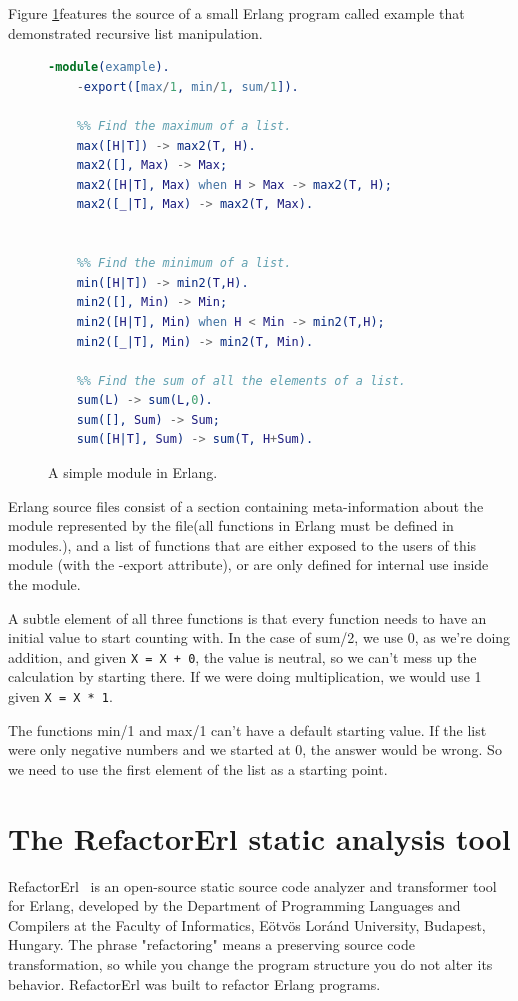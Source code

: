 Figure \ref{fig:example_erlang}features the source of a small Erlang program
called example that demonstrated recursive list manipulation.
\begin{figure}[h]
	\begin{lstlisting}[extendedchars=true, language=Erlang, basicstyle=\footnotesize\ttfamily, keywordstyle=\color{red}]
	-module(example). 
	-export([max/1, min/1, sum/1]).
	
	%% Find the maximum of a list.
	max([H|T]) -> max2(T, H).
	max2([], Max) -> Max;
	max2([H|T], Max) when H > Max -> max2(T, H);
	max2([_|T], Max) -> max2(T, Max).
	

	%% Find the minimum of a list.
	min([H|T]) -> min2(T,H).
	min2([], Min) -> Min;
	min2([H|T], Min) when H < Min -> min2(T,H);
	min2([_|T], Min) -> min2(T, Min).
	
	%% Find the sum of all the elements of a list.
	sum(L) -> sum(L,0).
	sum([], Sum) -> Sum;
	sum([H|T], Sum) -> sum(T, H+Sum).
	\end{lstlisting}
\caption{A simple module in Erlang.}
\label{fig:example_erlang}
\end{figure}

Erlang source files consist of a section containing meta-information about the module represented by the file(all functions in Erlang must be defined in
modules.), and a list of functions that are either exposed to the users of this module (with the -export attribute), or are only defined for internal use inside the module.  

A subtle element of all three functions is that every function needs to have an initial value to start counting with. In the case of sum/2, we use 0, as we’re doing addition, and given \texttt{X = X + 0}, the value is neutral, so we can’t mess up the calculation by starting there. If we were doing multiplication, we would use 1 given \texttt{X = X * 1}. 

The functions min/1 and max/1 can’t have a default starting value. If the list were only negative numbers and we started at 0, the answer would be wrong. So we need to use the first element of the list as a starting point.

\section{The RefactorErl static analysis tool} 

RefactorErl~\cite{refactorerl1, refactorerl2} is an open-source static source code analyzer and transformer tool for Erlang, developed by the Department of Programming Languages and Compilers at the Faculty of Informatics, Eötvös Loránd University, Budapest, Hungary. The phrase "refactoring" means a preserving source code transformation, so while you change the program structure you do not alter its behavior. RefactorErl was built to refactor Erlang programs.

